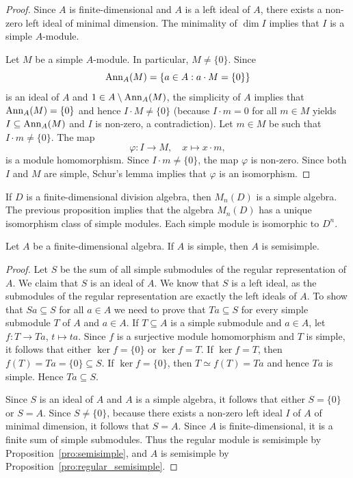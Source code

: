 \begin{proof}
	Since $A$ is finite-dimensional and $A$ is a left ideal of $A$, there exists a non-zero left ideal of minimal dimension. The minimality 
	of $\dim I$ implies that $I$ is a simple $A$-module. 
	
	Let $M$ be a simple $A$-module. In particular, $M\ne\{0\}$. 
	Since  
	\[
	\operatorname{Ann}_A(M)=\{a\in A:a\cdot M=\{0\}\}
	\]
	is an ideal of $A$ and $1\in A\setminus\operatorname{Ann}_A(M)$, the simplicity of $A$ implies that 
	$\operatorname{Ann}_A(M)=\{0\}$ and hence $I\cdot M\ne\{0\}$ (because $I\cdot m= 0$ for all $m\in M$ yields  
	$I\subseteq\operatorname{Ann}_A(M)$ and $I$ is non-zero, a contradiction). Let $m\in M$ be such 
	that $I\cdot m\ne\{0\}$. The map 
	\[
	\varphi\colon I\to M,\quad
	x\mapsto x\cdot m,
	\]
	is a module homomorphism. Since $I\cdot m\ne\{0\}$, the map $\varphi$ is non-zero. 
	Since both $I$ and $M$ are simple, Schur's lemma implies that $\varphi$ is an isomorphism. 
\end{proof}

If $D$ is a finite-dimensional division algebra, then $M_n(D)$ is a simple
algebra. The previous proposition implies that the algebra $M_n(D)$ has a
unique isomorphism class of simple modules. Each simple module is isomorphic to
$D^n$. 

\begin{proposition}
    Let $A$ be a finite-dimensional algebra. 
    If $A$ is simple, then $A$ is semisimple. 
\end{proposition}

\begin{proof}
  Let $S$ be the sum of all simple submodules of the regular
  representation of $A$.  We claim that $S$ is an ideal of $A$. We know that
  $S$ is a left ideal, as the submodules of the regular representation are
  exactly the left ideals of $A$. To show that $Sa\subseteq S$ for all $a\in A$
  we need to prove that $Ta\subseteq S$ for every simple submodule $T$ of $A$ and
  $a\in A$.  If $T\subseteq A$ is a simple submodule and $a\in A$, let $f\colon
  T\to Ta$, $t\mapsto ta$. Since $f$ is a surjective module homomorphism and
  $T$ is simple, it follows that either $\ker f=\{0\}$ or $\ker f=T$. If $\ker
  f=T$, then $f(T)=Ta=\{0\}\subseteq S$. If $\ker f=\{0\}$, then $T\simeq
  f(T)=Ta$ and hence $Ta$ is simple. Hence $Ta\subseteq S$. 
	
  Since $S$ is an ideal of $A$ and $A$ is a simple algebra, it follows that either
  $S=\{0\}$ or $S=A$.  Since $S\ne\{0\}$, because  there exists a non-zero left
  ideal $I$ of $A$ of minimal dimension, it follows
  that $S=A$. Since $A$ is finite-dimensional, it is a 
  finite sum of simple submodules. 
  Thus the regular module is semisimple by Proposition~\ref{pro:semisimple},
  and $A$ is semisimple by Proposition~\ref{pro:regular_semisimple}. 
\end{proof}

